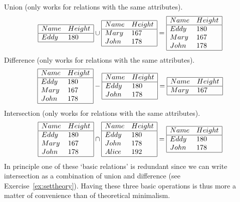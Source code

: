 Union (only works for relations with the same attributes).
$$
\begin{array}{|ll|}
\hline
Name & Height\\
\hline
Eddy & 180\\
\hline
\end{array}
\cup
\begin{array}{|ll|}
\hline
Name & Height\\
\hline
Mary & 167\\
John & 178\\
\hline
\end{array}
=
\begin{array}{|ll|}
\hline
Name & Height\\
\hline
Eddy & 180\\
Mary & 167\\
John & 178\\
\hline
\end{array}
$$
Difference (only works for relations with the same attributes).
$$
\begin{array}{|ll|}
\hline
Name & Height\\
\hline
Eddy & 180\\
Mary & 167\\
John & 178\\
\hline
\end{array} 
-
\begin{array}{|ll|}
\hline
Name & Height\\
\hline
Eddy & 180\\
John & 178\\
\hline
\end{array} 
=
\begin{array}{|ll|}
\hline
Name & Height\\
\hline
Mary & 167\\
\hline
\end{array}
$$
Intersection (only works for relations with the same attributes).
$$
\begin{array}{|ll|}
\hline
Name & Height\\
\hline
Eddy & 180\\
Mary & 167\\
John & 178\\
\hline
\end{array} 
\cap
\begin{array}{|ll|}
\hline
Name & Height\\
\hline
Eddy  & 180\\
John  & 178\\
Alice & 192\\
\hline
\end{array}
=
\begin{array}{|ll|}
\hline
Name & Height\\
\hline
Eddy  & 180\\
John  & 178\\
\hline
\end{array}
$$
In principle one of these `basic relations' is redundant since we can write
intersection as a combination of union and difference (see
Exercise~\ref{ex:settheory}). Having these three basic operations is thus more
a matter of convenience than of theoretical minimalism.



